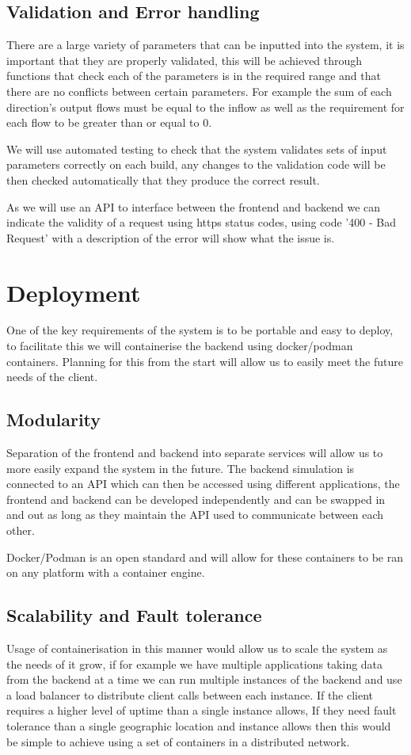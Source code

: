 \documentclass{article}
\begin{document}
\subsection{Validation and Error handling}

There are a large variety of parameters that can be inputted into the system, it is 
important that they are properly validated, this will be achieved through functions 
that check each of the parameters is in the required range and that there are no 
conflicts between certain parameters. For example the sum of each direction's output 
flows must be equal to the inflow as well as the requirement for each flow to be 
greater than or equal to 0. 

We will use automated testing to check that the system validates sets of input 
parameters correctly on each build, any changes to the validation code will be then 
checked automatically that they produce the correct result. 

As we will use an API to interface between the frontend and backend we can indicate 
the validity of a request using https status codes, using code '400 - Bad Request' 
with a description of the error will show what the issue is.

\section{Deployment}
One of the key requirements of the system is to be portable and easy to deploy, 
to facilitate this we will containerise the backend using docker/podman containers. 
Planning for this from the start will allow us to easily meet the future needs of the 
client. 

\subsection{Modularity}
Separation of the frontend and backend into separate services will allow us to more 
easily expand the system in the future. The backend simulation is connected to an API 
which can then be accessed using different applications, the frontend and backend can 
be developed independently and can be swapped in and out as long as they maintain the 
API used to communicate between each other.

Docker/Podman is an open standard and will allow for these containers to be ran 
on any platform with a container engine.

\subsection{Scalability and Fault tolerance}
Usage of containerisation in this manner would allow us to scale the system as the 
needs of it grow, if for example we have multiple applications taking data from the 
backend at a time we can run multiple instances of the backend and use a load balancer 
to distribute client calls between each instance. If the client requires a higher level 
of uptime than a single instance allows, If they need fault tolerance than a single 
geographic location and instance allows then this would be simple to achieve using a 
set of containers in a distributed network.
\end{document}
